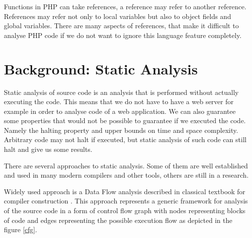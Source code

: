Functions in PHP can take references, a reference may 
refer to another reference. References may refer not only to 
local variables but also to object fields and global variables. 
There are many aspects of references, that make it difficult 
to analyse PHP code if we do not want to ignore this 
language feature completely.

\section{Background: Static Analysis}
Static analysis of source code is an analysis that is performed without 
actually executing the code. This means that we do not have to have a
web server for example in order to analyse code of a web application. 
We can also guarantee some properties that would not be possible to 
guarantee if we executed the code. Namely the halting property and 
upper bounds on time and space complexity. Arbitrary code may not 
halt if executed, but static analysis of such code can still halt 
and give us some results.

There are several approaches to static analysis. Some of them are well 
established and used in many modern compilers and other tools, others 
are still in a research.

Widely used approach is a Data Flow analysis described in 
classical textbook for compiler construction \cite{aho1985compilers}. 
This approach represents a generic framework for analysis of the 
source code in a form of control flow graph with nodes representing 
blocks of code and edges representing the possible execution flow as 
depicted in the figure \ref{cfg}.

